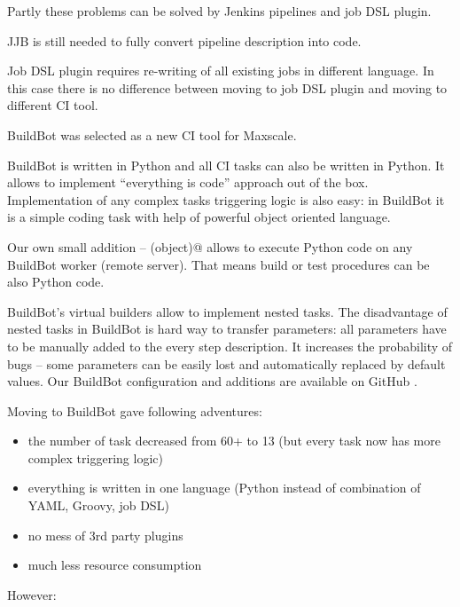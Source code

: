\documentclass[10pt, a5paper]{article}
\begin{document}
Partly these problems can be solved by Jenkins pipelines and job DSL plugin.

JJB is still needed to fully convert pipeline description into code.

Job DSL plugin requires re-writing of all existing jobs in different language. In this case there is no difference between moving to job DSL plugin and moving to different CI tool.

BuildBot \cite{bib6} was selected as a new CI tool for Maxscale.

BuildBot is written in Python and all CI tasks can also be written in Python. It allows to implement ``everything is code'' approach out of the box. Implementation of any complex tasks triggering logic is also easy: in BuildBot it is a simple coding task with help of powerful object oriented language.

Our own small addition -- \verb@PythonFunctionRenderer(object)@ \linebreak allows to execute Python code on any BuildBot worker (remote server). That means build or test procedures can be also Python code.

BuildBot's virtual builders allow to implement nested tasks. The disadvantage of nested tasks in BuildBot is hard way to transfer para\-meters: all parameters have to be manually added to the every step description. It increases the probability of bugs -- some parameters can be easily lost and automatically replaced by default values. Our BuildBot configuration and additions are available on GitHub \cite{bib7}.

Moving to BuildBot gave following adventures:

\begin{itemize}
  \item the number of task decreased from 60+ to 13 (but every task now has more complex triggering logic)
  \item everything is written in one language (Python instead of combina\-tion of YAML, Groovy, job DSL)
  \item no mess of 3rd party plugins
  \item much less resource consumption
\end{itemize}

However:
\end{document}
